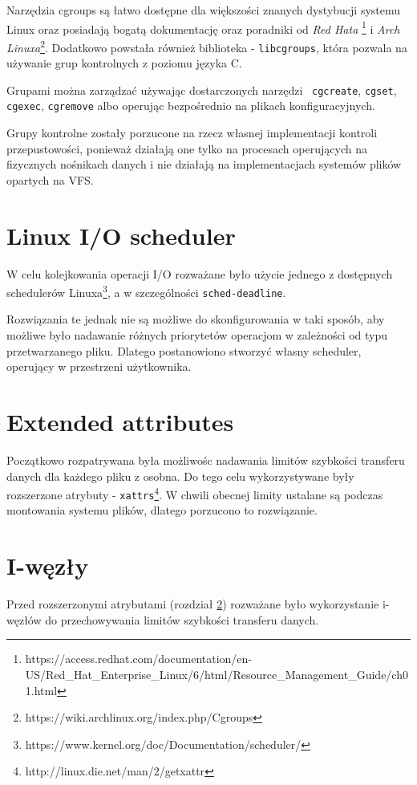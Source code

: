 Narzędzia cgroups są łatwo dostępne dla większości znanych dystybucji
systemu Linux oraz posiadają bogatą dokumentację oraz poradniki od \textit{Red Hata}
\footnote{https://access.redhat.com/documentation/en-US/Red\_Hat\_Enterprise\_Linux/6/html/Resource\_Management\_Guide/ch01.html}
i \textit{Arch Linuxa}\footnote{https://wiki.archlinux.org/index.php/Cgroups}. 
Dodatkowo powstała
również biblioteka - \texttt{libcgroups}, która pozwala na używanie grup
kontrolnych z poziomu języka C.

Grupami można zarządzać używając dostarczonych narzędzi \ \texttt{cgcreate}, \texttt{cgset}, 
\texttt{cgexec}, \texttt{cgremove} albo operując bezpośrednio na plikach konfiguracyjnych.

Grupy kontrolne zostały porzucone na rzecz własnej implementacji kontroli przepustowości, ponieważ
działają one tylko na procesach operujących na fizycznych nośnikach danych i nie działają
na implementacjach systemów plików opartych na VFS.

\section{Linux I/O scheduler}
W celu kolejkowania operacji I/O rozważane było użycie jednego z dostępnych schedulerów
Linuxa\footnote{https://www.kernel.org/doc/Documentation/scheduler/}, a w szczególności
\texttt{sched-deadline}.

Rozwiązania te jednak nie są możliwe do skonfigurowania w taki sposób, aby możliwe było nadawanie
różnych priorytetów operacjom w zależności od typu przetwarzanego pliku. Dlatego postanowiono
stworzyć własny scheduler, operujący w przestrzeni użytkownika.

\section{Extended attributes}\label{sec:xattrs}
Początkowo rozpatrywana była możliwośc nadawania limitów szybkości transferu danych dla każdego pliku z osobna.
Do tego celu wykorzystywane były rozszerzone atrybuty - \texttt{xattrs}\footnote{http://linux.die.net/man/2/getxattr}. W chwili obecnej limity ustalane 
są podczas montowania systemu plików, dlatego porzucono to rozwiązanie.

\section{I-węzły}

Przed rozszerzonymi atrybutami (rozdział \ref{sec:xattrs}) rozważane
było wykorzystanie i-węzłów do przechowywania limitów szybkości transferu danych.
